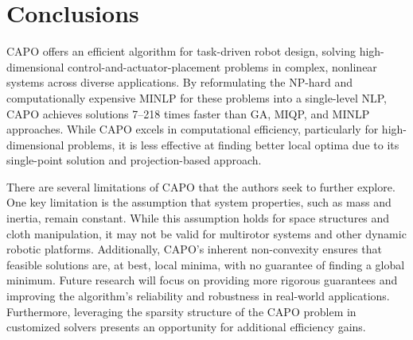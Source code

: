 \section{Conclusions}
\label{sec:capo:conclusions}
CAPO offers an efficient algorithm for task-driven robot design, solving high-dimensional control-and-actuator-placement problems in complex, nonlinear systems across diverse applications. By reformulating the NP-hard and computationally expensive MINLP for these problems into a single-level NLP, CAPO achieves solutions 7–218 times faster than GA, MIQP, and MINLP approaches. While CAPO excels in computational efficiency, particularly for high-dimensional problems, it is less effective at finding better local optima due to its single-point solution and projection-based approach.

There are several limitations of CAPO that the authors seek to further explore. One key limitation is the assumption that system properties, such as mass and inertia, remain constant. While this assumption holds for space structures and cloth manipulation, it may not be valid for multirotor systems and other dynamic robotic platforms. Additionally, CAPO's inherent non-convexity ensures that feasible solutions are, at best, local minima, with no guarantee of finding a global minimum. Future research will focus on providing more rigorous guarantees and improving the algorithm's reliability and robustness in real-world applications. Furthermore, leveraging the sparsity structure of the CAPO problem in customized solvers presents an opportunity for additional efficiency gains.


